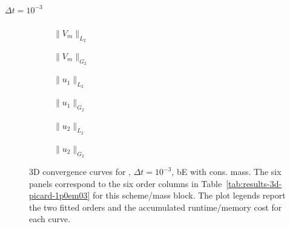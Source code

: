 \paragraph{$\Delta t=10^{-3}$}

\begin{figure}[p]
\centering
\begin{subfigure}{0.485\linewidth}
\centering
{}
\caption{$\|V_m\|_{L_2}$}
\label{fig:results-3d-picard-1p0em03-backwardeuler-consistent-a}
\end{subfigure}
\hfill
\begin{subfigure}{0.485\linewidth}
\centering
{}
\caption{$\|V_m\|_{G_2}$}
\label{fig:results-3d-picard-1p0em03-backwardeuler-consistent-b}
\end{subfigure}
\par\vspace{0.8em}
\begin{subfigure}{0.485\linewidth}
\centering
{}
\caption{$\|u_1\|_{L_2}$}
\label{fig:results-3d-picard-1p0em03-backwardeuler-consistent-c}
\end{subfigure}
\hfill
\begin{subfigure}{0.485\linewidth}
\centering
{}
\caption{$\|u_1\|_{G_2}$}
\label{fig:results-3d-picard-1p0em03-backwardeuler-consistent-d}
\end{subfigure}
\par\vspace{0.8em}
\begin{subfigure}{0.485\linewidth}
\centering
{}
\caption{$\|u_2\|_{L_2}$}
\label{fig:results-3d-picard-1p0em03-backwardeuler-consistent-e}
\end{subfigure}
\hfill
\begin{subfigure}{0.485\linewidth}
\centering
{}
\caption{$\|u_2\|_{G_2}$}
\label{fig:results-3d-picard-1p0em03-backwardeuler-consistent-f}
\end{subfigure}
\caption{3D convergence curves for , $\Delta t=10^{-3}$, bE with cons. mass. The six panels correspond to the six order columns in Table~\ref{tab:results-3d-picard-1p0em03} for this scheme/mass block. The plot legends report the two fitted orders and the accumulated runtime/memory cost for each curve.}
\label{fig:results-3d-picard-1p0em03-backwardeuler-consistent}
\end{figure}
\FloatBarrier

